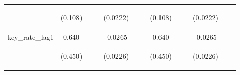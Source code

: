 \documentclass[]{article}
\begin{document}
\begin{center}
\begin{tabular}{lcccccccccccc}
\vspace{4pt} & \begin{footnotesize}(0.108)\end{footnotesize} & \begin{footnotesize}\end{footnotesize} & \begin{footnotesize}\end{footnotesize} & \begin{footnotesize}(0.0222)\end{footnotesize} & \begin{footnotesize}\end{footnotesize} & \begin{footnotesize}\end{footnotesize} & \begin{footnotesize}(0.108)\end{footnotesize} & \begin{footnotesize}\end{footnotesize} & \begin{footnotesize}\end{footnotesize} & \begin{footnotesize}(0.0222)\end{footnotesize} & \begin{footnotesize}\end{footnotesize} & \begin{footnotesize}\end{footnotesize} \\
key\_rate\_lag1 & 0.640 &  &  & -0.0265 &  &  & 0.640 &  &  & -0.0265 &  &  \\
\vspace{4pt} & \begin{footnotesize}(0.450)\end{footnotesize} & \begin{footnotesize}\end{footnotesize} & \begin{footnotesize}\end{footnotesize} & \begin{footnotesize}(0.0226)\end{footnotesize} & \begin{footnotesize}\end{footnotesize} & \begin{footnotesize}\end{footnotesize} & \begin{footnotesize}(0.450)\end{footnotesize} & \begin{footnotesize}\end{footnotesize} & \begin{footnotesize}\end{footnotesize} & \begin{footnotesize}(0.0226)\end{footnotesize} & \begin{footnotesize}\end{footnotesize} & \begin{footnotesize}\end{footnotesize} \\

\end{tabular}
\end{center}
\end{document}
